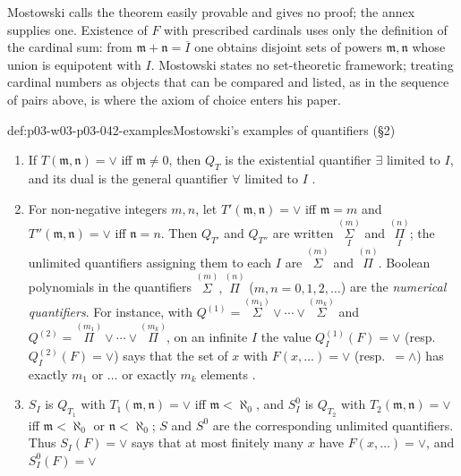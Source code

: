 Mostowski calls the theorem easily provable and gives no proof; the annex
supplies one.  Existence of \(F\) with prescribed cardinals uses only the
definition of the cardinal sum: from \(\mathfrak m+\mathfrak n=
\overline I\) one obtains disjoint sets of powers \(\mathfrak m,\mathfrak
n\) whose union is equipotent with \(I\).  Mostowski states no set-theoretic
framework; treating cardinal numbers as objects that can be compared and
listed, as in the sequence of pairs above, is where the axiom of choice
enters his paper.

\begin{hbexample}{def:p03-w03-p03-042-examples}{Mostowski's examples of quantifiers (\S2)}
\begin{enumerate}
\item[(a)] If \(T(\mathfrak m,\mathfrak n)=\vee\) iff \(\mathfrak m\neq0\),
      then \(Q_T\) is the existential quantifier \(\exists\) limited to
      \(I\), and its dual is the general quantifier \(\forall\) limited to
      \(I\) \cite[p.~14]{Mostowski1957}.
\item[(b)] For non-negative integers \(m,n\), let \(T'(\mathfrak m,
      \mathfrak n)=\vee\) iff \(\mathfrak m=m\) and \(T''(\mathfrak m,
      \mathfrak n)=\vee\) iff \(\mathfrak n=n\).  Then \(Q_{T'}\) and
      \(Q_{T''}\) are written \(\overset{(m)}{\underset{I}{\Sigma}}\) and
      \(\overset{(n)}{\underset{I}{\Pi}}\); the unlimited quantifiers
      assigning them to each \(I\) are \(\overset{(m)}{\Sigma}\) and
      \(\overset{(n)}{\Pi}\).  Boolean polynomials in the quantifiers
      \(\overset{(m)}{\Sigma},\overset{(n)}{\Pi}\) (\(m,n=0,1,2,\ldots\))
      are the \emph{numerical quantifiers}.  For instance, with
      \(Q^{(1)}=\overset{(m_1)}{\Sigma}\vee\cdots\vee
      \overset{(m_k)}{\Sigma}\) and \(Q^{(2)}=\overset{(m_1)}{\Pi}\vee\cdots\vee
      \overset{(m_k)}{\Pi}\), on an infinite \(I\) the value
      \(Q^{(1)}_I(F)=\vee\) (resp.\ \(Q^{(2)}_I(F)=\vee\)) says that the set
      of \(x\) with \(F(x,\ldots)=\vee\) (resp.\ \(=\wedge\)) has exactly
      \(m_1\) or \(\ldots\) or exactly \(m_k\) elements
      \cite[p.~14]{Mostowski1957}.
\item[(c)] \(S_I\) is \(Q_{T_1}\) with \(T_1(\mathfrak m,\mathfrak n)=\vee\)
      iff \(\mathfrak m<\aleph_0\), and \(S^0_I\) is \(Q_{T_2}\) with
      \(T_2(\mathfrak m,\mathfrak n)=\vee\) iff \(\mathfrak m<\aleph_0\) or
      \(\mathfrak n<\aleph_0\); \(S\) and \(S^0\) are the corresponding
      unlimited quantifiers.  Thus \(S_I(F)=\vee\) says that at most
      finitely many \(x\) have \(F(x,\ldots)=\vee\), and \(S^0_I(F)=\vee\)

\end{enumerate}
\end{hbexample}
